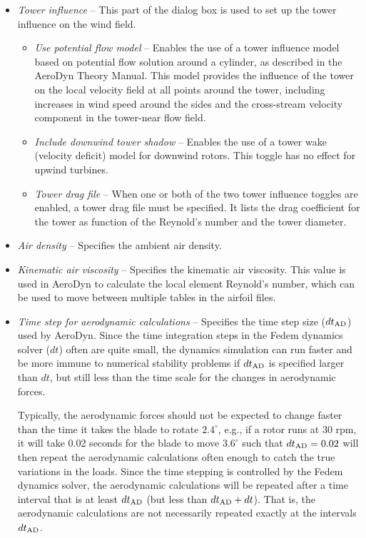 \begin{itemize}
\item{\sl Tower influence} --
  This part of the dialog box is used to set up the tower influence
  on the wind field.

  \begin{itemize}
  \item{\sl Use potential flow model} --
    Enables the use of a tower influence model based on potential flow solution
    around a cylinder, as described in the AeroDyn Theory Manual.
    This model provides the influence of the tower on the local velocity field
    at all points around the tower, including increases in wind speed around the
    sides and the cross-stream velocity component in the tower-near flow field.
  \item{\sl Include downwind tower shadow} --
    Enables the use of a tower wake (velocity deficit) model for downwind
    rotors. This toggle has no effect for upwind turbines.
  \item{\sl Tower drag file} --
    When one or both of the two tower influence toggles are enabled,
    a tower drag file must be specified.
    It lists the drag coefficient for the tower as function of the Reynold's
    number and the tower diameter.
  \end{itemize}

\item{\sl Air density} -- Specifies the ambient air density.

\item{\sl Kinematic air viscosity} -- Specifies the kinematic air viscosity.
  This value is used in AeroDyn to calculate the local element Reynold's number,
  which can be used to move between multiple tables in the airfoil files.

\item{\sl Time step for aerodynamic calculations} --
  Specifies the time step size ($dt_{\rm AD}$) used by AeroDyn.
  Since the time integration steps in the Fedem dynamics solver ($dt$) often are
  quite small, the dynamics simulation can run faster and be more immune to
  numerical stability problems if $dt_{\rm AD}$ is specified larger than $dt$,
  but still less than the time scale for the changes in aerodynamic forces.

  Typically, the aerodynamic forces should not be expected to change faster than
  the time it takes the blade to rotate $2.4^\circ$, e.g.,
  if a rotor runs at 30 rpm, it will take 0.02 seconds for the blade to move
  $3.6^\circ$ such that $dt_{\rm AD}=0.02$ will then repeat the aerodynamic
  calculations often enough to catch the true variations in the loads.
  Since the time stepping is controlled by the Fedem dynamics solver,
  the aerodynamic calculations will be repeated after a time interval that is
  at least $dt_{\rm AD}$ (but less than $dt_{\rm AD}+dt$).
  That is, the aerodynamic calculations are not necessarily repeated exactly
  at the intervals $dt_{\rm AD}$.


\end{itemize}
